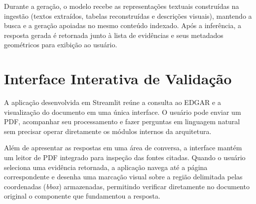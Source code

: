 Durante a geração, o modelo recebe as representações textuais construídas na ingestão (textos extraídos, tabelas reconstruídas e descrições visuais), mantendo a busca e a geração apoiadas no mesmo conteúdo indexado. Após a inferência, a resposta gerada é retornada junto à lista de evidências e seus metadados geométricos para exibição ao usuário.

\section{Interface Interativa de Validação}
\label{sec:interface_validacao}
\label{subsec:interacao_aplicacao_cliente}

A aplicação desenvolvida em Streamlit reúne a consulta ao EDGAR e a visualização do documento em uma única interface. O usuário pode enviar um PDF, acompanhar seu processamento e fazer perguntas em linguagem natural sem precisar operar diretamente os módulos internos da arquitetura.

Além de apresentar as respostas em uma área de conversa, a interface mantém um leitor de PDF integrado para inspeção das fontes citadas. Quando o usuário seleciona uma evidência retornada, a aplicação navega até a página correspondente e desenha uma marcação visual sobre a região delimitada pelas coordenadas (\textit{bbox}) armazenadas, permitindo verificar diretamente no documento original o componente que fundamentou a resposta.
